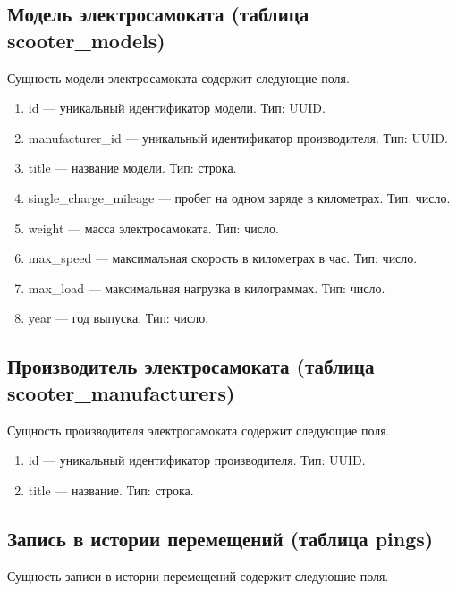 \subsection{Модель электросамоката (таблица scooter\_models)}

Сущность модели электросамоката содержит следующие поля.

\begin{enumerate}
    \item id --- уникальный идентификатор модели. Тип: UUID.
    \item manufacturer\_id --- уникальный идентификатор производителя. Тип: UUID.
    \item title --- название модели. Тип: строка.
    \item single\_charge\_mileage --- пробег на одном заряде в километрах. Тип: число.
    \item weight --- масса электросамоката. Тип: число.
    \item max\_speed --- максимальная скорость в километрах в час. Тип: число.
    \item max\_load --- максимальная нагрузка в килограммах. Тип: число.
    \item year --- год выпуска. Тип: число.
\end{enumerate}

\subsection{Производитель электросамоката (таблица scooter\_manufacturers)}

Сущность производителя электросамоката содержит следующие поля.

\begin{enumerate}
    \item id --- уникальный идентификатор производителя. Тип: UUID.
    \item title --- название. Тип: строка.
\end{enumerate}

\subsection{Запись в истории перемещений (таблица pings)}

Сущность записи в истории перемещений содержит следующие поля.

